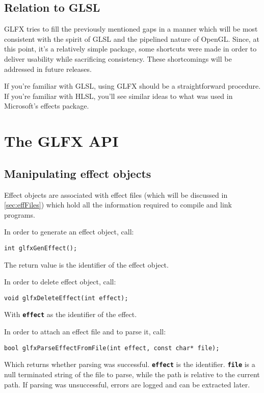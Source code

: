 \documentclass[11pt,a4paper,final,titlepage]{article}
\let\orgautoref\autoref
\renewcommand{\autoref}{%
\def\sectionautorefname{Sec.}%
\def\subsectionautorefname{Sec.}%
\def\algocflineautorefname{Alg.}%
\def\lemmaautorefname{Lemma}%
\orgautoref}
\begin{document}
\subsection{Relation to GLSL}
GLFX tries to fill the previously mentioned gaps in a manner which will be most consistent with
the spirit of GLSL and the pipelined nature of OpenGL. Since, at this point, it's a relatively simple
package, some shortcuts were made in order to deliver usability while sacrificing consistency.
These shortcomings will be addressed in future releases.

If you're familiar with GLSL, using GLFX should be a straightforward procedure. If you're familiar
with HLSL, you'll see similar ideas to what was used in Microsoft's effects package.

\pagebreak
\section{The GLFX API}

\subsection{Manipulating effect objects}
Effect objects are associated with effect files (which will be discussed in \autoref{sec:effFiles})
which hold all the information required to compile and link programs.

In order to generate an effect object, call:

\begin{lstlisting}
int glfxGenEffect();
\end{lstlisting}
The return value is the identifier of the effect object.

In order to delete effect object, call:

\begin{lstlisting}
void glfxDeleteEffect(int effect);
\end{lstlisting}
With \texttt{\textbf{effect}} as the identifier of the effect.

In order to attach an effect file and to parse it, call:

\begin{lstlisting}
bool glfxParseEffectFromFile(int effect, const char* file);
\end{lstlisting}
Which returns whether parsing was successful. \texttt{\textbf{effect}} is the identifier.
\texttt{\textbf{file}} is a null terminated string of the file to parse, while the path is relative
to the current path. If parsing was unsuccessful, errors are logged and can be extracted later.
\end{document}
